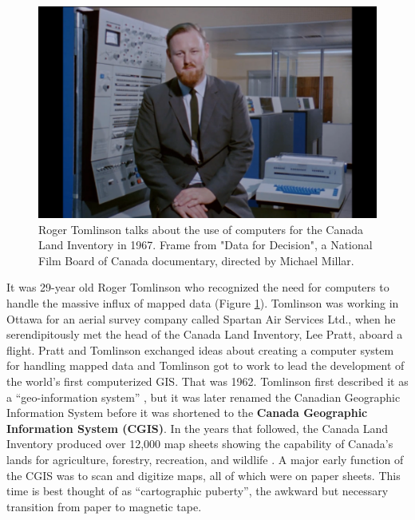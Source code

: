 \documentclass[
]{book}
\begin{document}
\begin{figure}
\includegraphics[width=0.75\linewidth]{images/01-data-for-decisions} \caption{Roger Tomlinson talks about the use of computers for the Canada Land Inventory in 1967. Frame from "Data for Decision", a National Film Board of Canada documentary, directed by Michael Millar.}\label{fig:1-data-for-decisions}
\end{figure}

It was 29-year old Roger Tomlinson who recognized the need for computers to handle the massive influx of mapped data (Figure \ref{fig:1-data-for-decisions}). Tomlinson was working in Ottawa for an aerial survey company called Spartan Air Services Ltd., when he serendipitously met the head of the Canada Land Inventory, Lee Pratt, aboard a flight. Pratt and Tomlinson exchanged ideas about creating a computer system for handling mapped data and Tomlinson got to work to lead the development of the world's first computerized GIS. That was 1962. Tomlinson first described it as a ``geo-information system'' \citep{Tomlinson_1967}, but it was later renamed the Canadian Geographic Information System before it was shortened to the \textbf{Canada Geographic Information System (CGIS)}. In the years that followed, the Canada Land Inventory produced over 12,000 map sheets showing the capability of Canada's lands for agriculture, forestry, recreation, and wildlife \citep{fisher_overview_1979}. A major early function of the CGIS was to scan and digitize maps, all of which were on paper sheets. This time is best thought of as ``cartographic puberty'', the awkward but necessary transition from paper to magnetic tape.
\end{document}
